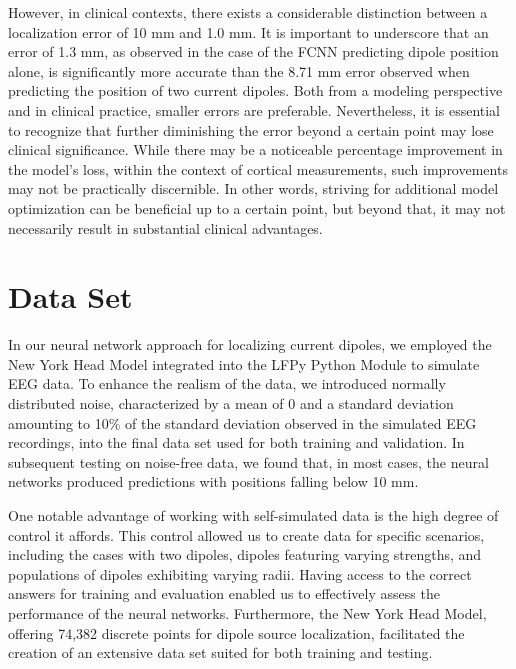 \documentclass[a4paper, UKenglish, 11pt]{uiomaster}
\begin{document}
However, in clinical contexts, there exists a considerable distinction between a localization error of 10 mm and 1.0 mm. It is important to underscore that an error of 1.3 mm, as observed in the case of the FCNN predicting dipole position alone, is significantly more accurate than the 8.71 mm error observed when predicting the position of two current dipoles. Both from a modeling perspective and in clinical practice, smaller errors are preferable. Nevertheless, it is essential to recognize that further diminishing the error beyond a certain point may lose clinical significance. While there may be a noticeable percentage improvement in the model's loss, within the context of cortical measurements, such improvements may not be practically discernible. In other words, striving for additional model optimization can be beneficial up to a certain point, but beyond that, it may not necessarily result in substantial clinical advantages.



\section{Data Set} \label{sec:data_set}
In our neural network approach for localizing current dipoles, we employed the New York Head Model integrated into the LFPy Python Module to simulate EEG data. To enhance the realism of the data, we introduced normally distributed noise, characterized by a mean of 0 and a standard deviation amounting to 10$\%$ of the standard deviation observed in the simulated EEG recordings, into the final data set used for both training and validation. In subsequent testing on noise-free data, we found that, in most cases, the neural networks produced predictions with positions falling below 10 mm.

One notable advantage of working with self-simulated data is the high degree of control it affords. This control allowed us to create data for specific scenarios, including the cases with two dipoles, dipoles featuring varying strengths, and populations of dipoles exhibiting varying radii.  Having access to the correct answers for training and evaluation enabled us to effectively assess the performance of the neural networks. Furthermore, the New York Head Model, offering 74,382 discrete points for dipole source localization, facilitated the creation of an extensive data set suited for both training and testing.
\end{document}
